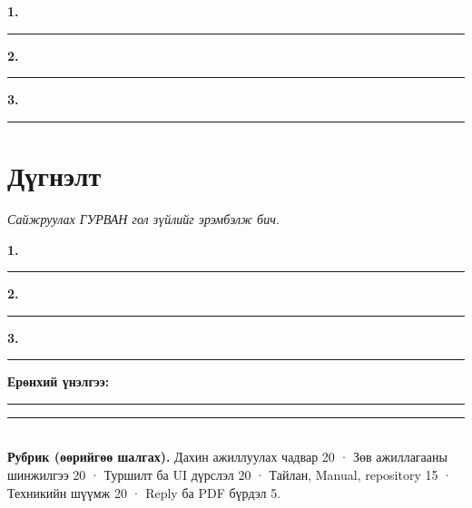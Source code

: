 \documentclass[11pt,a4paper]{article}
\begin{document}
\textbf{1.}\\[3mm]
\noindent\rule{\textwidth}{0.4pt}

\vspace{3mm}\textbf{2.}\\[3mm]
\noindent\rule{\textwidth}{0.4pt}

\vspace{3mm}\textbf{3.}\\[3mm]
\noindent\rule{\textwidth}{0.4pt}

\section{Дүгнэлт}
\emph{Сайжруулах ГУРВАН гол зүйлийг эрэмбэлж бич.}

\textbf{1.}\\[3mm]
\noindent\rule{\textwidth}{0.4pt}

\vspace{3mm}\textbf{2.}\\[3mm]
\noindent\rule{\textwidth}{0.4pt}

\vspace{3mm}\textbf{3.}\\[3mm]
\noindent\rule{\textwidth}{0.4pt}

\vspace{6mm}
\noindent\textbf{Ерөнхий үнэлгээ:}\\[3mm]
\noindent\rule{\textwidth}{0.4pt}

\vfill
\noindent\rule{\textwidth}{0.4pt}\\[2pt]
\small
\textbf{Рубрик (өөрийгөө шалгах).}
Дахин ажиллуулах чадвар 20 · Зөв ажиллагааны шинжилгээ 20 ·
Туршилт ба UI дүрслэл 20 · Тайлан, Manual, repository 15 ·
Техникийн шүүмж 20 · Reply ба PDF бүрдэл 5.
\end{document}
